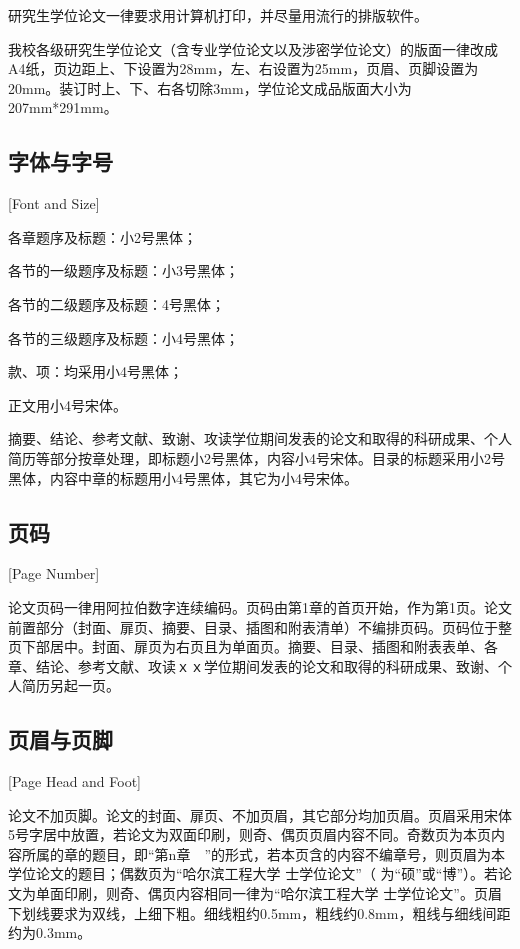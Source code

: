 研究生学位论文一律要求用计算机打印，并尽量用流行的排版软件。

我校各级研究生学位论文（含专业学位论文以及涉密学位论文）的版面一律改成A4纸，页边距上、下设置为28mm，左、右设置为25mm，页眉、页脚设置为20mm。装订时上、下、右各切除3mm，学位论文成品版面大小为207mm*291mm。

\subsection{字体与字号}[Font and Size]

各章题序及标题：小2号黑体；

各节的一级题序及标题：小3号黑体；

各节的二级题序及标题：4号黑体；

各节的三级题序及标题：小4号黑体；

款、项：均采用小4号黑体；

正文用小4号宋体。

摘要、结论、参考文献、致谢、攻读学位期间发表的论文和取得的科研成果、个人简历等部分按章处理，即标题小2号黑体，内容小4号宋体。目录的标题采用小2号黑体，内容中章的标题用小4号黑体，其它为小4号宋体。

\subsection{页码}[Page Number]

论文页码一律用阿拉伯数字连续编码。页码由第1章的首页开始，作为第1页。论文前置部分（封面、扉页、摘要、目录、插图和附表清单）不编排页码。页码位于整页下部居中。封面、扉页为右页且为单面页。摘要、目录、插图和附表表单、各章、结论、参考文献、攻读ｘｘ学位期间发表的论文和取得的科研成果、致谢、个人简历另起一页。

\subsection{页眉与页脚}[Page Head and Foot]

论文不加页脚。论文的封面、扉页、不加页眉，其它部分均加页眉。页眉采用宋体5号字居中放置，若论文为双面印刷，则奇、偶页页眉内容不同。奇数页为本页内容所属的章的题目，即“第n章　”的形式，若本页含的内容不编章号，则页眉为本学位论文的题目；偶数页为“哈尔滨工程大学 \underline{\hspace{1em}} 士学位论文”（ \underline{\hspace{1em}} 为“硕”或“博”）。若论文为单面印刷，则奇、偶页内容相同一律为“哈尔滨工程大学 \underline{\hspace{1em}} 士学位论文”。页眉下划线要求为双线，上细下粗。细线粗约0.5mm，粗线约0.8mm，粗线与细线间距约为0.3mm。

